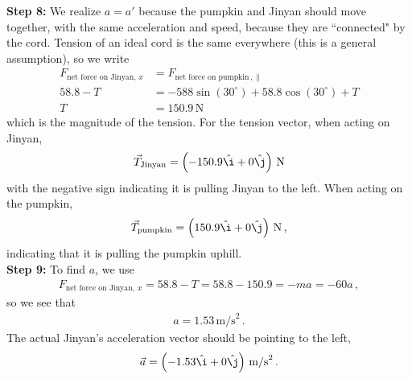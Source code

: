 \documentclass[11pt]{article}
\begin{document}
\textbf{Step 8:} We realize $a=a'$ because the pumpkin and Jinyan should move together, with the same acceleration and speed, because they are ``connected" by the cord. Tension of an ideal cord is the same everywhere (this is a general assumption), so we write
\begin{align*}
F_{\text{net force on Jinyan},\,x} &= F_{\text{net force on pumpkin}\,, \parallel}\\
58.8 -T &=-588\sin(30^\circ) + 58.8\cos(30^\circ)+T\\
T&= 150.9\,\text{N}
\end{align*}
which is the magnitude of the tension. For the tension vector, when acting on Jinyan, 
\begin{align*}
\vec{T}_{\text{Jinyan}} = \left(-150.9\hat{\i}+0\hat{\j}\right)\,\text{N}  
\end{align*}
with the negative sign indicating it is pulling Jinyan to the left. When acting on the pumpkin,
\begin{align*}
\vec{T}_{\text{pumpkin}} = \left(150.9\hat{\i}+0\hat{\j}\right)\,\text{N}  \,,
\end{align*}
indicating that it is pulling the pumpkin uphill.\\

\textbf{Step 9:} To find $a$, we use 
\begin{align*}
F_{\text{net force on Jinyan},\,x} =58.8 -T=58.8-150.9 =-ma = -60a\,,
\end{align*}
so we see that 
\begin{align*}
a = 1.53\,\text{m/s}^2\,.
\end{align*}
The actual Jinyan's acceleration vector should be pointing to the left, 
\begin{align*}
\vec{a} = \left(-1.53\hat{\i}+0\hat{\j}\right)\,\text{m/s}^2\,.
\end{align*}
\end{document}
